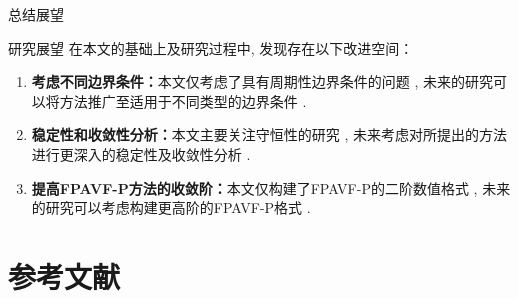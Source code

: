 \documentclass[aspectratio=169]{beamer}
\numberwithin{theorem}{section} %
\numberwithin{equation}{section}%
\numberwithin{figure}{section}%
\numberwithin{table}{section}%
\begin{document}
\begin{frame}{总结展望}
	\begin{block}{研究展望}
		在本文的基础上及研究过程中, 发现存在以下改进空间：
		\begin{enumerate}
			\item \textbf{\textcolor[rgb]{0.227,0.373,0.306}{考虑不同边界条件：}}本文仅考虑了具有周期性边界条件的问题 , 未来的研究可以将方法推广至适用于不同类型的边界条件 .
			\item \textbf{\textcolor[rgb]{0.227,0.373,0.306}{稳定性和收敛性分析：}}本文主要关注守恒性的研究 , 未来考虑对所提出的方法进行更深入的稳定性及收敛性分析 . 
			\item \textbf{\textcolor[rgb]{0.227,0.373,0.306}{提高FPAVF-P方法的收敛阶：}}本文仅构建了FPAVF-P的二阶数值格式 , 未来的研究可以考虑构建更高阶的FPAVF-P格式 . 
		\end{enumerate}
	\end{block}
\end{frame}

\section{参考文献}
\end{document}
